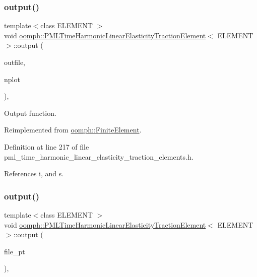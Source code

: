 \subsubsection{\texorpdfstring{output()}{output()}\hspace{0.1cm}{\footnotesize\ttfamily [2/4]}}
{\footnotesize\ttfamily template$<$class E\+L\+E\+M\+E\+NT $>$ \\
void \hyperlink{classoomph_1_1PMLTimeHarmonicLinearElasticityTractionElement}{oomph\+::\+P\+M\+L\+Time\+Harmonic\+Linear\+Elasticity\+Traction\+Element}$<$ E\+L\+E\+M\+E\+NT $>$\+::output (\begin{DoxyParamCaption}\item[{std\+::ostream \&}]{outfile,  }\item[{const unsigned \&}]{nplot }\end{DoxyParamCaption})\hspace{0.3cm}{\ttfamily [inline]}, {\ttfamily [virtual]}}



Output function. 



Reimplemented from \hyperlink{classoomph_1_1FiniteElement_afa9d9b2670f999b43e6679c9dd28c457}{oomph\+::\+Finite\+Element}.



Definition at line 217 of file pml\+\_\+time\+\_\+harmonic\+\_\+linear\+\_\+elasticity\+\_\+traction\+\_\+elements.\+h.



References i, and s.

\mbox{\label{classoomph_1_1PMLTimeHarmonicLinearElasticityTractionElement_a91e943645cfd3e58d48fe9ad90d1a2d3}} 
\subsubsection{\texorpdfstring{output()}{output()}\hspace{0.1cm}{\footnotesize\ttfamily [3/4]}}
{\footnotesize\ttfamily template$<$class E\+L\+E\+M\+E\+NT $>$ \\
void \hyperlink{classoomph_1_1PMLTimeHarmonicLinearElasticityTractionElement}{oomph\+::\+P\+M\+L\+Time\+Harmonic\+Linear\+Elasticity\+Traction\+Element}$<$ E\+L\+E\+M\+E\+NT $>$\+::output (\begin{DoxyParamCaption}\item[{F\+I\+LE $\ast$}]{file\+\_\+pt }\end{DoxyParamCaption})\hspace{0.3cm}{\ttfamily [inline]}, {\ttfamily [virtual]}}



